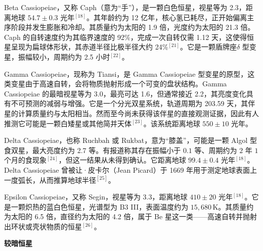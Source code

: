 Beta Cassiopeiae，又称 Caph（意为“手”），是一颗白色恒星，视星等为 2.3，距离地球 $54.7\pm0.3$ 光年$^{[18]}$。其年龄约为 12 亿年，核心氢已耗尽，正开始偏离主序阶段并发生膨胀和冷却。其质量约为太阳的 1.9 倍，光度约为太阳的 21.3 倍。Caph 的自转速度约为其临界速度的 92\%，完成一次自转仅需 1.12 天，这使得恒星呈现为扁球体形状，其赤道半径比极半径大约 24\%$^{[21]}$。它是一颗盾牌座$\delta$ 型变星，振幅较小，周期约为 2.5 小时$^{[22]}$。

Gamma Cassiopeiae，现称为 Tiansi，是 Gamma Cassiopeiae 型变星的原型，这类变星由于高速自转，会将物质抛射形成一个可变的盘状结构。Gamma Cassiopeiae 的最暗视星等为 3.0，最亮可达 1.6，但通常接近 2.2，其亮度变化具有不可预测的减弱与增强。它是一个分光双星系统，轨道周期为 203.59 天，其伴星的计算质量约与太阳相当。然而至今尚未获得该伴星的直接观测证据，因此有人推测它可能是一颗白矮星或其他简并天体$^{[23]}$。该系统距离地球 $550\pm10$ 光年。

Delta Cassiopeiae，也称 Ruchbah 或 Rukbat，意为“膝盖”，可能是一颗 Algol 型食双星，最大亮度约为 2.7 等。有报道称其存在振幅小于 $0.1$ 等、周期约为 $2$ 年 $1$ 个月的食现象$^{[24]}$，但这一结果从未得到确认。它距离地球 $99.4\pm0.4$ 光年$^{[18]}$。Delta Cassiopeiae 曾被让·皮卡尔（Jean Picard）于 1669 年用于测定地球表面上一度弧长，从而推算地球半径$^{[25]}$。

Epsilon Cassiopeiae，又称 Segin，视星等为 3.3，距离地球 $410\pm20$ 光年$^{[18]}$。它是一颗炽热的蓝白色恒星，光谱型为 B3 III，表面温度约为 $15{,}680\,\mathrm{K}$。其质量约为太阳的 6.5 倍，直径约为太阳的 4.2 倍，属于 Be 星这一类——高速自转并抛射出环状或壳状物质的恒星$^{[26]}$。

\textbf{较暗恒星}
